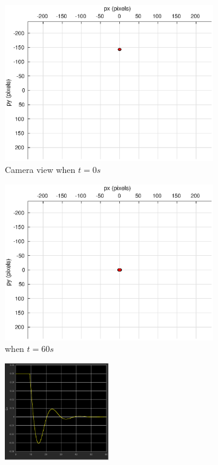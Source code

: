 \begin{figure}[htbp]
\begin{subfigure}[t]{0.45\linewidth}
		\includegraphics[width=\textwidth]{images/chapter4/inertial_camera_0mps}
		\caption{Camera view when $t=0s$}
	\end{subfigure}
	\begin{subfigure}[t]{0.45\linewidth}
		\includegraphics[width=\textwidth]{images/chapter4/inertial_camera_0mps_60s}
		\caption{when $t=60s$}
	\end{subfigure}
	\begin{subfigure}[t]{0.8\linewidth}
		\centering
		\includegraphics[width=0.5\textwidth]{images/chapter4/inertial_Ex_0mps}

\end{subfigure}
\end{figure}
